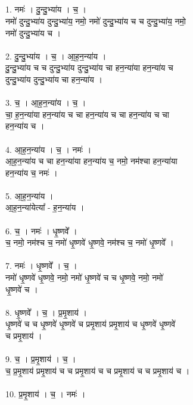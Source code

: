 \subsection{}
1. नमः॑ । दु॒न्दु॒भ्या॑य । च॒ ।\\
नमो॑ दुन्दु॒भ्या॑य दुन्दु॒भ्या॑य॒ नमो॒ नमो॑ दुन्दु॒भ्या॑य च च दुन्दु॒भ्या॑य॒ नमो॒\\
नमो॑ दुन्दु॒भ्या॑य च ।\\
\\
2. दु॒न्दु॒भ्या॑य । च॒ । आ॒ह॒न॒न्या॑य ।\\
दु॒न्दु॒भ्या॑य च च दुन्दु॒भ्या॑य दुन्दु॒भ्या॑य चा हन॒न्या॑या हन॒न्या॑य च\\
दुन्दु॒भ्या॑य दुन्दु॒भ्या॑य चा हन॒न्या॑य ।\\
\\
3. च॒ । आ॒ह॒न॒न्या॑य । च॒ ।\\
चा॒ ह॒न॒न्या॑या हन॒न्या॑य च चा हन॒न्या॑य च चा हन॒न्या॑य च चा\\
हन॒न्या॑य च ।\\
\\
4. आ॒ह॒न॒न्या॑य । च॒ । नमः॑ ।\\
आ॒ह॒न॒न्या॑य च चा हन॒न्या॑या हन॒न्या॑य च॒ नमो॒ नम॑श्चा हन॒न्या॑या\\
हन॒न्या॑य च॒ नमः॑ ।\\
\\
5. आ॒ह॒न॒न्या॑य ।\\
आ॒ह॒न॒न्या॑येत्या᳚ - ह॒न॒न्या॑य ।\\
\\
6. च॒ । नमः॑ । धृ॒ष्णवे᳚ ।\\
च॒ नमो॒ नम॑श्च च॒ नमो॑ धृ॒ष्णवे॑ धृ॒ष्णवे॒ नम॑श्च च॒ नमो॑ धृ॒ष्णवे᳚ ।\\
\\
7. नमः॑ । धृ॒ष्णवे᳚ । च॒ ।\\
नमो॑ धृ॒ष्णवे॑ धृ॒ष्णवे॒ नमो॒ नमो॑ धृ॒ष्णवे॑ च च धृ॒ष्णवे॒ नमो॒ नमो॑\\
धृ॒ष्णवे॑ च ।\\
\\
8. धृ॒ष्णवे᳚ । च॒ । प्र॒मृ॒शाय॑ ।\\
धृ॒ष्णवे॑ च च धृ॒ष्णवे॑ धृ॒ष्णवे॑ च प्रमृ॒शाय॑ प्रमृ॒शाय॑ च धृ॒ष्णवे॑ धृ॒ष्णवे॑\\
च प्रमृ॒शाय॑ ।\\
\\
9. च॒ । प्र॒मृ॒शाय॑ । च॒ ।\\
च॒ प्र॒मृ॒शाय॑ प्रमृ॒शाय॑ च च प्रमृ॒शाय॑ च च प्रमृ॒शाय॑ च च प्रमृ॒शाय॑ च ।\\
\\
10. प्र॒मृ॒शाय॑ । च॒ । नमः॑ ।\\
